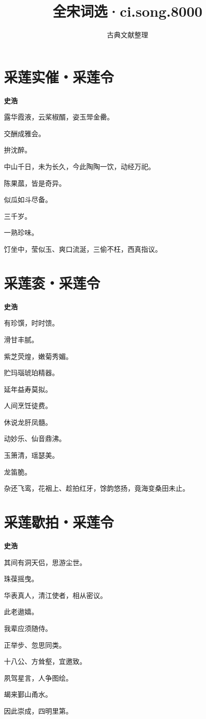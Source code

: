 \documentclass[12pt,a4paper]{ctexbook}
\title{全宋词选·ci.song.8000}
\author{古典文献整理}
\date{}
\begin{document}
\maketitle
\tableofcontents
\newpage
\section{采莲实催・采莲令}
\textbf{史浩}\par\vspace{0.5em}
露华霞液，云桨椒醑，姿玉斝金罍。\par
交酬成雅会。\par
拚沈醉。\par
中山千日，未为长久，今此陶陶一饮，动经万祀。\par
陈果蓏，皆是奇异。\par
似瓜如斗尽备。\par
三千岁。\par
一熟珍味。\par
饤坐中，莹似玉、爽口流涎，三偷不枉，西真指议。\par

\section{采莲衮・采莲令}
\textbf{史浩}\par\vspace{0.5em}
有珍馔，时时馈。\par
滑甘丰腻。\par
紫芝荧煌，嫩菊秀媚。\par
贮玛瑙琥珀精器。\par
延年益寿莫拟。\par
人间烹饪徒费。\par
休说龙肝凤髓。\par
动妙乐、仙音鼎沸。\par
玉箫清，瑶瑟美。\par
龙笛脆。\par
杂还飞鸾，花裀上、趁拍红牙，馀韵悠扬，竟海变桑田未止。\par

\section{采莲歇拍・采莲令}
\textbf{史浩}\par\vspace{0.5em}
其间有洞天侣，思游尘世。\par
珠葆摇曳。\par
华表真人，清江使者，相从密议。\par
此老遨嬉。\par
我辈应须随侍。\par
正举步、忽思同类。\par
十八公、方耸壑，宜邀致。\par
夙驾星言，人争图绘。\par
朅来鄞山甬水。\par
因此崇成，四明里第。\par
\end{document}
